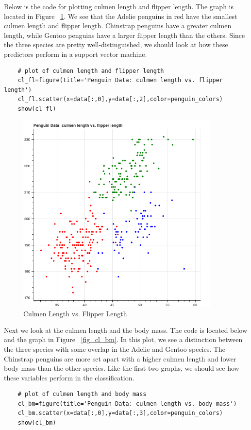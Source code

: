 \documentclass[12pt]{article}
\begin{document}
Below is the code for plotting culmen length and flipper length. The graph is located in Figure ~\ref{fig_cl_fl}. We see that the Adelie penguins in red have the smallest culmen length and flipper length. Chinstrap penguins have a greater culmen length, while Gentoo penguins have a larger flipper length than the others. Since the three species are pretty well-distinguished, we should look at how these predictors perform in a support vector machine.

\begin{verbatim}
    # plot of culmen length and flipper length
    cl_fl=figure(title='Penguin Data: culmen length vs. flipper length')
    cl_fl.scatter(x=data[:,0],y=data[:,2],color=penguin_colors)
    show(cl_fl)
\end{verbatim}

\begin{figure}[H]
    \centering
    \includegraphics[width=4in]{Figures/penguins/cl_fl.png}
    \caption{Culmen Length vs. Flipper Length}
    \label{fig_cl_fl}
\end{figure}

Next we look at the culmen length and the body mass. The code is located below and the graph in Figure ~\ref{fig_cl_bm}. In this plot, we see a distinction between the three species with some overlap in the Adelie and Gentoo species. The Chinstrap penguins are more set apart with a higher culmen length and lower body mass than the other species. Like the first two graphs, we should see how these variables perform in the classification.

\begin{verbatim}
    # plot of culmen length and body mass
    cl_bm=figure(title='Penguin Data: culmen length vs. body mass')
    cl_bm.scatter(x=data[:,0],y=data[:,3],color=penguin_colors)
    show(cl_bm)
\end{verbatim}
\end{document}
